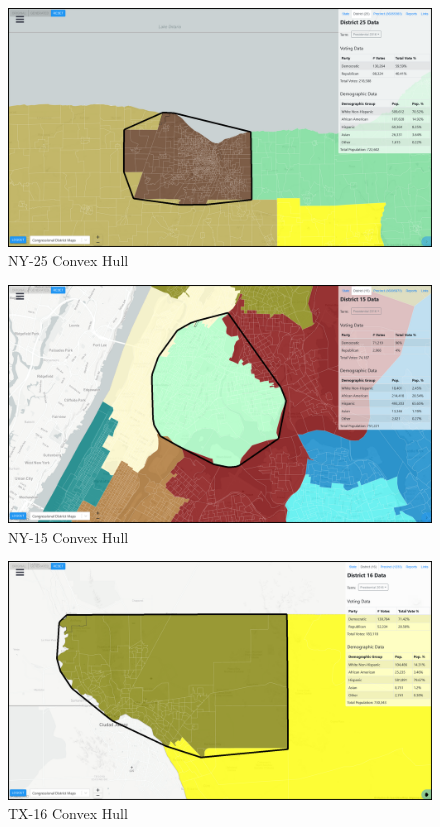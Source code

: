 \documentclass[letterpaper]{article}
\begin{document}
\begin{figure}[H]
	\includegraphics[width=\linewidth]{./figures/NY-25-ConvexHull.png}
	\caption{NY-25 Convex Hull}
	\label{fig:ny25convexHull}
\end{figure}

\begin{figure}[H]
	\includegraphics[width=\linewidth]{./figures/NY-15-ConvexHull.png}
	\caption{NY-15 Convex Hull}
	\label{fig:ny15convexHull}
\end{figure}

\begin{figure}[H]
	\includegraphics[width=\linewidth]{./figures/TX-16-ConvexHull.png}
	\caption{TX-16 Convex Hull}
	\label{fig:tx16convexHull}
\end{figure}
\end{document}
